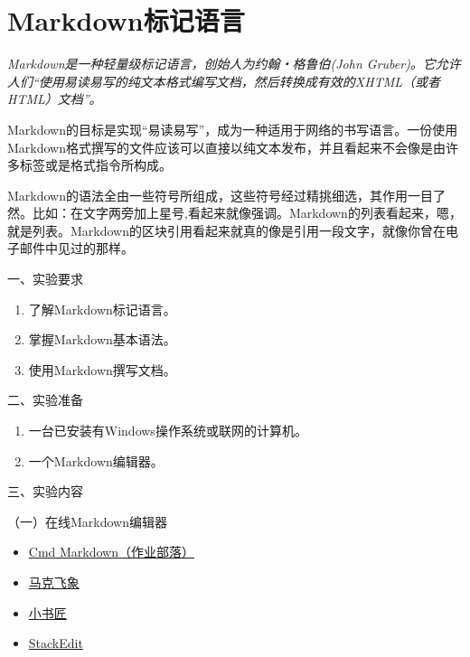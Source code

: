 \setcounter{chapter}{-1}
\chapter{Markdown标记语言}

{\itshape
Markdown是一种轻量级标记语言，创始人为约翰・格鲁伯(John Gruber)。它允许人们“使用易读易写的纯文本格式编写文档，然后转换成有效的XHTML（或者HTML）文档”。

Markdown的目标是实现“易读易写”，成为一种适用于网络的书写语言。一份使用Markdown格式撰写的文件应该可以直接以纯文本发布，并且看起来不会像是由许多标签或是格式指令所构成。

Markdown的语法全由一些符号所组成，这些符号经过精挑细选，其作用一目了然。比如：在文字两旁加上星号,看起来就像强调。Markdown的列表看起来，嗯，就是列表。Markdown的区块引用看起来就真的像是引用一段文字，就像你曾在电子邮件中见过的那样。
}

\vspace{0.2in}
\noindent
一、实验要求
\begin{enumerate}
  \item 了解Markdown标记语言。
  \item 掌握Markdown基本语法。
  \item 使用Markdown撰写文档。
\end{enumerate}

\vspace{0.2in}
\noindent
二、实验准备
\begin{enumerate}
  \item 一台已安装有Windows操作系统或联网的计算机。
  \item 一个Markdown编辑器。
\end{enumerate}

\vspace{0.2in}
\noindent
三、实验内容

\vspace{0.1in}
（一）在线Markdown编辑器
\begin{itemize}
  \item \href{https://www.zybuluo.com}{Cmd Markdown（作业部落）}
  \item \href{https://maxiang.io}{马克飞象}
  \item \href{http://markdown.xiaoshujiang.com/}{小书匠}
  \item \href{https://stackedit.io/editor}{StackEdit}
\end{itemize}

